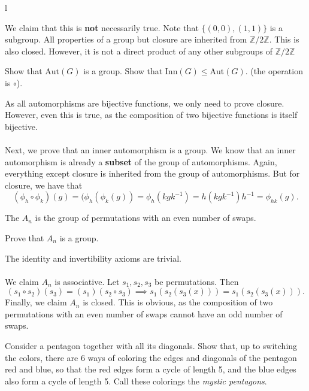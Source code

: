 l\documentclass{scrartcl}
\begin{document}
\begin{soln}
    We claim that this is \textbf{not} necessarily true. Note that $\{(0, 0), (1, 1)\}$ is a subgroup. All properties of a group but closure are inherited from $\mathbb{Z} / 2\mathbb{Z}$. This is also closed. However, it is not a direct product of any other subgroups of $\mathbb{Z} / 2\mathbb{Z}$
\end{soln}

\begin{problem}[11]
    Show that $\text{Aut}(G)$ is a group. Show that $\text{Inn}(G) \le \text{Aut}(G).$ (the operation is $\circ$).
\end{problem}

\begin{soln}
    As all automorphisms are bijective functions, we only need to prove closure. However, even this is true, as the composition of two bijective functions is itself bijective. \\ \\
    Next, we prove that an inner automorphism is a group. We know that an inner automorphism is already a \textbf{subset} of the group of automorphisms. Again, everything except closure is inherited from the group of automorphisms. But for closure, we have that
    $$(\phi_h \circ \phi_k)(g) = (\phi_h(\phi_k(g)) = \phi_h(kgk^{-1}) = h(kgk^{-1})h^{-1} = \phi_{hk}(g).$$
\end{soln}

\begin{definition}
    The  $A_n$ is the group of permutations with an even number of swaps.
\end{definition}

\begin{problem}[15]
    Prove that $A_n$ is a group.
\end{problem}

\begin{soln}
    The identity and invertibility axioms are trivial. \\
    \\
    We claim $A_n$ is associative. Let $s_1, s_2, s_3$ be permutations. Then $$(s_1 \circ s_2) (s_3) = (s_1) (s_2 \circ s_3) \implies s_1(s_2(s_3(x))) = s_1(s_2(s_3(x))).$$
    Finally, we claim $A_n$ is closed. This is obvious, as the composition of two permutations with an even number of swaps cannot have an odd number of swaps.
\end{soln}

\begin{problem}[23]
	Consider a pentagon together with all its diagonals. Show that, up to switching the colors, there are 6 ways of coloring the edges and diagonals of the pentagon red and blue, so that the red edges form a cycle of length 5, and the blue edges also form a cycle of length 5. Call these colorings the \textit{mystic pentagons}.
\end{problem}
\end{document}
